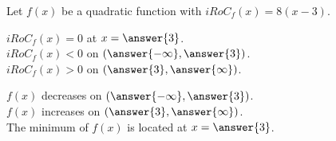 \documentclass{ximera}
\author{Lee Wayand}
\begin{document}
\begin{exercise} 









Let $f(x)$ be a quadratic function with $iRoC_f(x) = 8(x-3)$. \\






\begin{question}



$iRoC_f(x) = 0$  at  $x = \answer{3}$. \\


$iRoC_f(x) < 0$ on $\left( \answer{-\infty}, \answer{3} \right)$. \\


$iRoC_f(x) > 0$ on $\left( \answer{3}, \answer{\infty} \right)$. \\

\end{question}





\begin{question}



$f(x)$ decreases on $\left( \answer{-\infty}, \answer{3} \right)$. \\


$f(x)$ increases on $\left( \answer{3}, \answer{\infty} \right)$. \\


The minimum of $f(x)$ is located at  $x = \answer{3}$. \\

\end{question}
















\end{exercise}
\end{document}
